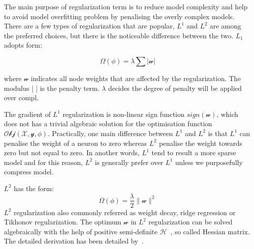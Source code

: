 
The main purpose of regularization term is to reduce model complexity and help to avoid model overfitting problem by penalising the overly complex models. There are a few types of regularization that are popular, $L^1$ and $L^2$ are among the preferred choices, but there is the noticeable difference between the two. $L_1$ adopts form:

\begin{equation}
   \Omega(\phi) = \lambda \sum | \mathcal{w} |
\end{equation}

where $\mathcal{w}$ indicates all node weights that are affected by the regularization. The modulus |  | is the penalty term. $\lambda$ decides the degree of penalty will be applied over compl. 
\par 
The gradient of $L^1$ regularization is non-linear sign function $sign (\mathcal{w})$, which does not has a trivial algebraic solution for the optimisation function $\mathcal{Obj}(\mathcal{X},\mathcal{y},\phi)$. Practically, one main difference between $L^1$ and $L^2$ is that $L^1$ can penalise the weight of a neuron to zero whereas $L^2$ penalise the weight towards zero but not equal to zero. In another words, $L^1$ tend to result a more sparse model and for this reason, $L^2$ is generally prefer over $L^1$ unless we purposefully compress model.

$L^2$ has the form:
\begin{equation}
   \Omega(\phi) = \frac {\lambda}{2} \parallel \mathcal{w} \parallel^2
\end{equation}
$L^2$ regularization also commonly referred as weight decay, ridge regression or Tikhonov regularization. The optimum $\mathcal{w}$ in $L^2$ regularization can be solved algebraically with the help of positive semi-definite $\mathcal{H}$~\cite{Goodfellow-et-al-2016}, so called Hessian matrix. The detailed derivation has been detailed by~\citet{Goodfellow-et-al-2016}.